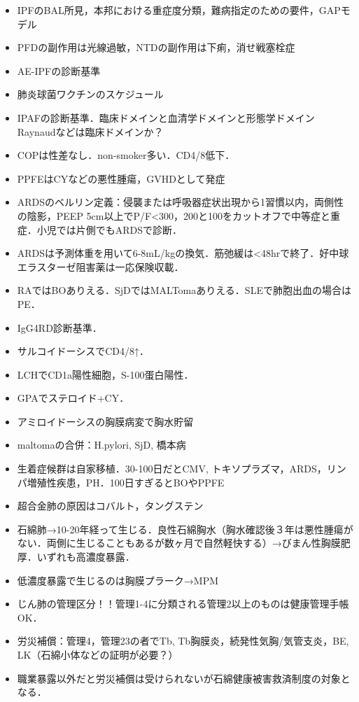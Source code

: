 \begin{itemize}
\item IPFのBAL所見，本邦における重症度分類，難病指定のための要件，GAPモデル
\item PFDの副作用は光線過敏，NTDの副作用は下痢，消せ戦塞栓症

\item AE-IPFの診断基準
\item 肺炎球菌ワクチンのスケジュール

\item IPAFの診断基準．臨床ドメインと血清学ドメインと形態学ドメイン Raynaudなどは臨床ドメインか？
\item COPは性差なし．non-smoker多い．CD4/8低下．
\item PPFEはCYなどの悪性腫瘍，GVHDとして発症

\item ARDSのベルリン定義：侵襲または呼吸器症状出現から1習慣以内，両側性の陰影，PEEP 5cm以上でP/F<300，200と100をカットオフで中等症と重症．小児では片側でもARDSで診断．
\item ARDSは予測体重を用いて6-8mL/kgの換気．筋弛緩は<48hrで終了．好中球エラスターゼ阻害薬は一応保険収載．


\item RAではBOありえる．SjDではMALTomaありえる．SLEで肺胞出血の場合はPE．
\item IgG4RD診断基準．
\item サルコイドーシスでCD4/8↑．
\item LCHでCD1a陽性細胞，S-100蛋白陽性．
\item GPAでステロイド+CY．
\item アミロイドーシスの胸膜病変で胸水貯留
\item maltomaの合併：H.pylori, SjD, 橋本病

\item 生着症候群は自家移植．30-100日だとCMV, トキソプラズマ，ARDS，リンパ増殖性疾患，PH．100日すぎるとBOやPPFE

\item 超合金肺の原因はコバルト，タングステン
\item 石綿肺→10-20年経って生じる．良性石綿胸水（胸水確認後３年は悪性腫瘍がない．両側に生じることもあるが数ヶ月で自然軽快する）→びまん性胸膜肥厚．いずれも高濃度暴露．
\item 低濃度暴露で生じるのは胸膜プラーク→MPM
\item じん肺の管理区分！！管理1-4に分類される管理2以上のものは健康管理手帳OK．
\item 労災補償：管理4，管理23の者でTb, Tb胸膜炎，続発性気胸/気管支炎，BE, LK（石綿小体などの証明が必要？）
\item 職業暴露以外だと労災補償は受けられないが石綿健康被害救済制度の対象となる．


\end{itemize}
